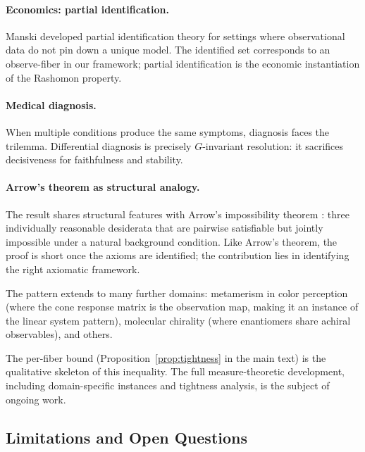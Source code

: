 \documentclass[11pt,a4paper]{article}
\begin{document}
\paragraph{Economics: partial identification.}
Manski \citep{manski2003partial} developed partial identification theory for
settings where observational data do not pin down a unique model.  The
identified set corresponds to an observe-fiber in our framework; partial
identification is the economic instantiation of the Rashomon property.

\paragraph{Medical diagnosis.}
When multiple conditions produce the same symptoms, diagnosis faces the
trilemma.  Differential diagnosis is precisely $G$-invariant resolution:
it sacrifices decisiveness for faithfulness and stability.

\paragraph{Arrow's theorem as structural analogy.}
The result shares structural features with Arrow's impossibility
theorem \citep{arrow1951social}: three individually reasonable desiderata
that are pairwise satisfiable but jointly impossible under a natural
background condition.  Like Arrow's theorem, the proof is short once the
axioms are identified; the contribution lies in identifying the right
axiomatic framework.

The pattern extends to many further domains: metamerism in color perception (where the cone response matrix is the observation map, making it an instance of the linear system pattern), molecular chirality (where enantiomers share achiral observables), and others.



The per-fiber bound (Proposition~\ref{prop:tightness} in the main text) is the qualitative skeleton of this inequality. The full measure-theoretic development, including domain-specific instances and tightness analysis, is the subject of ongoing work.

\subsection{Limitations and Open Questions}
\label{sec:limitations}
\end{document}
